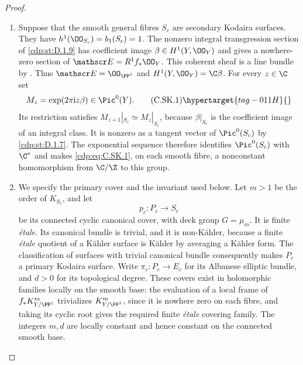 \begin{proof}

\begin{enumerate}[label={$\langle1\rangle$\arabic*.},leftmargin=*]
\item Suppose that the smooth general fibres $S_c$ are secondary
Kodaira surfaces. They have $h^1(\OO_{S_c})=b_1(S_c)=1$.
The nonzero integral transgression section of \ref{cdp:st:D.1.9} has
coefficient image $\beta\in H^1(Y,\OO_Y)$ and gives a
nowhere-zero section of $\mathscr E=R^1f_*\OO_Y$.
This coherent sheaf is a line bundle by . Thus
$\mathscr E=\OO_{\PP^1}$ and
$H^1(Y,\OO_Y)=\C\beta$. For every $z\in\C$ set
\[
 M_z=\exp(2\pi\mathrm i z\beta)\in\Pic^0(Y).
\tag{C.SK.1}\hypertarget{tag-011H}{}\label{cdp:eq:C.SK.1}
\]
Its restriction satisfies $M_{z+1}|_{S_c}\simeq M_z|_{S_c}$,
because $\beta|_{S_c}$ is the coefficient image of an
integral class. It is nonzero as a tangent vector of
$\Pic^0(S_c)$ by \ref{cdp:st:D.1.7}. The exponential sequence therefore
identifies $\Pic^0(S_c)$ with $\C^*$ and makes \eqref{cdp:eq:C.SK.1}, on
each smooth fibre, a nonconstant homomorphism from
$\C/\Z$ to this group.

\item We specify the primary cover and the invariant used below.
Let $m>1$ be the order of $K_{S_c}$, and let
\[
 p_c:P_c\longrightarrow S_c
\]
be its connected cyclic canonical cover, with deck group
$G=\mu_m$. It is finite \emph{\'etale}. Its canonical bundle
is trivial, and it is non-K\"ahler, because a finite
\emph{\'etale} quotient of a K\"ahler surface is K\"ahler
by averaging a K\"ahler form. The classification of
surfaces with trivial canonical bundle consequently makes
$P_c$ a primary Kodaira surface. Write
$\pi_c:P_c\to E_c$ for its Albanese elliptic bundle, and
$d>0$ for its topological degree. These covers exist in
holomorphic families locally on the smooth base: the
evaluation of a local frame of $f_*K_{Y/\PP^1}^{m}$
trivializes $K_{Y/\PP^1}^{m}$, since it is nowhere zero on
each fibre, and taking its cyclic root gives the required
finite \emph{\'etale} covering family. The integers $m,d$
are locally constant and hence constant on the connected
smooth base.


\end{enumerate}
\end{proof}
